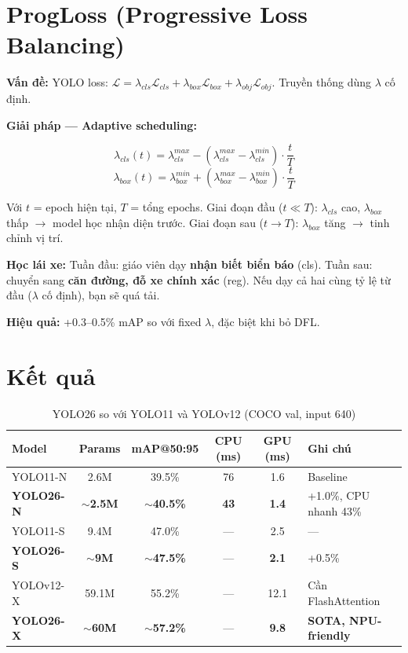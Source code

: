 \section{ProgLoss (Progressive Loss Balancing)}

\textbf{Vấn đề:} YOLO loss: $\mathcal{L} = \lambda_{cls} \mathcal{L}_{cls} + \lambda_{box} \mathcal{L}_{box} + \lambda_{obj} \mathcal{L}_{obj}$. Truyền thống dùng $\lambda$ cố định.

\textbf{Giải pháp --- Adaptive scheduling:}

\begin{equation}
\lambda_{cls}(t) = \lambda_{cls}^{max} - (\lambda_{cls}^{max} - \lambda_{cls}^{min}) \cdot \frac{t}{T}
\end{equation}
\begin{equation}
\lambda_{box}(t) = \lambda_{box}^{min} + (\lambda_{box}^{max} - \lambda_{box}^{min}) \cdot \frac{t}{T}
\end{equation}

Với $t$ = epoch hiện tại, $T$ = tổng epochs. Giai đoạn đầu ($t \ll T$): $\lambda_{cls}$ cao, $\lambda_{box}$ thấp $\rightarrow$ model học nhận diện trước. Giai đoạn sau ($t \to T$): $\lambda_{box}$ tăng $\rightarrow$ tinh chỉnh vị trí.

\begin{analogybox}
\textbf{Học lái xe:} Tuần đầu: giáo viên dạy \textbf{nhận biết biển báo} (cls). Tuần sau: chuyển sang \textbf{căn đường, đỗ xe chính xác} (reg). Nếu dạy cả hai cùng tỷ lệ từ đầu ($\lambda$ cố định), bạn sẽ quá tải.
\end{analogybox}

\textbf{Hiệu quả:} +0.3--0.5\% mAP so với fixed $\lambda$, đặc biệt khi bỏ DFL.

\section{Kết quả}
\begin{table}[H]\centering
\caption{YOLO26 so với YOLO11 và YOLOv12 (COCO val, input 640)}
\begin{tabular}{lccccl}\toprule
\textbf{Model} & \textbf{Params} & \textbf{mAP@50:95} & \textbf{CPU (ms)} & \textbf{GPU (ms)} & \textbf{Ghi chú}\\\midrule
YOLO11-N & 2.6M & 39.5\% & 76 & 1.6 & Baseline \\
\textbf{YOLO26-N} & \textbf{$\sim$2.5M} & \textbf{$\sim$40.5\%} & \textbf{43} & \textbf{1.4} & +1.0\%, CPU nhanh 43\% \\
YOLO11-S & 9.4M & 47.0\% & --- & 2.5 & --- \\
\textbf{YOLO26-S} & \textbf{$\sim$9M} & \textbf{$\sim$47.5\%} & --- & \textbf{2.1} & +0.5\% \\
YOLOv12-X & 59.1M & 55.2\% & --- & 12.1 & Cần FlashAttention \\
\textbf{YOLO26-X} & \textbf{$\sim$60M} & \textbf{$\sim$57.2\%} & --- & \textbf{9.8} & \textbf{SOTA, NPU-friendly} \\\bottomrule
\end{tabular}
\end{table}

